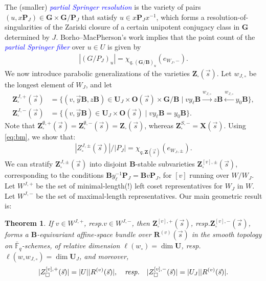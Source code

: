 \documentclass[submission]{FPSAC2025}
\newtheorem{thm}{Theorem}
\newcommand{\dfemph}[1]{\textcolor{blue}{\emph{#1}}}
\newcommand{\CharQ}[1]{\chi_{q, #1}}
\begin{document}
The (smaller) \dfemph{partial Springer resolution} is the variety of pairs $(u, x\mathbf{P}_J) \in \mathbf{G} \times \mathbf{G}/\mathbf{P}_J$ that satisfy $u \in x\mathbf{P}_Jx^{-1}$, which forms a resolution-of-singularities of the Zariski closure of a certain unipotent conjugacy class in $\mathbf{G}$ determined by $J$.
Borho--MacPherson's work implies that the point count of the \dfemph{partial Springer fiber} over $u \in U$ is given by
\begin{align}\label{eq:bm}
|(G/P_J)_u| = \CharQ{(\mathbf{G}/\mathbf{B})_u}(e_{W_J, -}).
\end{align}
We now introduce parabolic generalizations of the varieties $\mathbf{Z}_\square(\vec{s})$.
Let $w_{J, \circ}$ be the longest element of $W_J$, and let
\begin{align}
\mathbf{Z}_\square^{J, +}(\vec{s})
	&= \{(v, \vec{y}\mathbf{B}, z\mathbf{B}) \in \mathbf{U}_J \times \mathbf{O}(\vec{s}) \times \mathbf{G}/\mathbf{B} \mid
		vy_\ell\mathbf{B}
			\xrightarrow{w_{J, \circ}} z\mathbf{B}
			\xleftarrow{w_{J, \circ}} y_0\mathbf{B}
		\},\\
\mathbf{Z}_\square^{J, -}(\vec{s})
	&= \{(v, \vec{y}\mathbf{B}) \in \mathbf{U}_J \times \mathbf{O}(\vec{s}) \mid
		vy_\ell\mathbf{B} = y_0\mathbf{B}
		\}.
\end{align}
Note that $\mathbf{Z}_\square^{\emptyset, +}(\vec{s}) = \mathbf{Z}_\square^{\emptyset, -}(\vec{s}) = \mathbf{Z}_\square(\vec{s})$, whereas $\mathbf{Z}_\square^{S, -} = \mathbf{X}(\vec{s})$.
Using \eqref{eq:bm}, we show that:
\begin{align}\label{eq:point-count}
|Z_\square^{J, \pm}(\vec{s})|/|P_J|
	= \CharQ{\mathbf{Z}(\vec{s})}(e_{W_J, \pm}).
\end{align}
We can stratify $\mathbf{Z}_\square^{J, \pm}(\vec{s})$ into disjoint $\mathbf{B}$-stable subvarieties $\mathbf{Z}_\square^{[v], \pm}(\vec{s})$, corresponding to the conditions $\mathbf{B}y_\ell^{-1}\mathbf{P}_J = \mathbf{B}v\mathbf{P}_J$, for $[v]$ running over $W/W_J$.
Let $W^{J, +}$ be the set of minimal-length(!) left coset representatives for $W_J$ in $W$.
Let $W^{J, -}$ be the set of maximal-length representatives.
Our main geometric result is:

\begin{thm}\label{thm:z-vs-r}
If $v \in W^{J, +}$, \emph{resp.}\@ $v \in W^{J, -}$, then $\mathbf{Z}_\square^{[v], +}(\vec{s})$, \emph{resp.}\@ $\mathbf{Z}_\square^{[v], -}(\vec{s})$, forms a $\mathbf{B}$-equivariant affine-space bundle over $\mathbf{R}^{(v)}(\vec{s})$ in the smooth topology on $\bar{\mathbb{F}}_q$-schemes, of relative dimension $\ell(w_\circ) = \dim \mathbf{U}$, \emph{resp.}\@ $\ell(w_\circ w_{J, \circ}) = \dim \mathbf{U}_J$, and moreover,
\begin{align}
|Z_\square^{[v], +}(\vec{s})| = |U||R^{(v)}(\vec{s})|,
	\quad\emph{resp.}\quad
	|Z_\square^{[v], -}(\vec{s})| = |U_J||R^{(v)}(\vec{s})|.
\end{align}
\end{thm}
\end{document}
